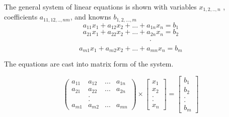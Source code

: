 \documentclass[fleqn]{beamer} %
\newcommand{\sectionIsubsectionIItitle}{}
\begin{document}
			\begin{frame}
				\frametitle{\sectionIsubsectionIItitle} \small
				\bigskip

				\begin{fleqn}
		
					The general system of linear equations  is shown with variables $x_{1,2,..,n}$ , coefficients $a_{11,12,..,nm}$, and knowns $b_{1,2,...,m}$ \vspace{1mm}\\		  
					
					\[a_{11} x_1 + a_{12} x_{2} + ... + a_{1n} x_n = b_1 \] 
					\[a_{21} x_1 + a_{22} x_{2} + ... + a_{2n} x_n = b_2 \] 
					\[\hspace{20mm}.\]		
					\[a_{m1} x_1 + a_{m2} x_{2} + ... + a_{mn} x_n = b_m \]			

				\end{fleqn}  

				The equations are cast into matrix form of the system. 	\\
				\begin{fleqn}

					\[ \left( \begin{array}{cccc}
					a_{11} & a_{12} & ...& a_{1n} \\
					a_{21} & a_{22} & ...& a_{2n} \\
					&.&&\\
					&.&&\\
					a_{m1} & a_{m2} & ...& a_{mn}\end{array} \right) \times \left[ \begin{array}{c}
					x_1 \\
					x_2 \\
					.\\
					.\\
					x_n \end{array} \right] = \left[ \begin{array}{c}
					b_1 \\
					b_2 \\
					.\\
					.\\
					b_m \end{array} \right]\] 

				\end{fleqn}

				\btVFill
			\end{frame}
\end{document}
